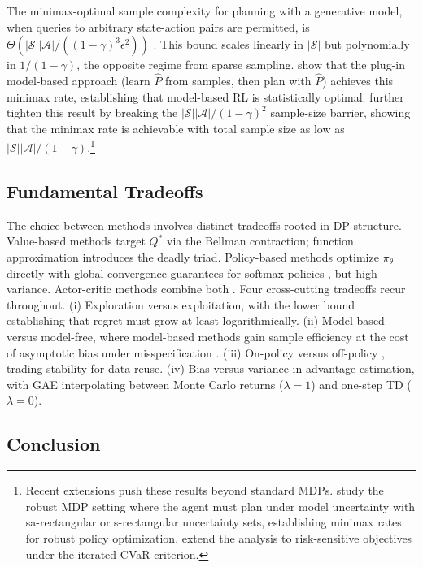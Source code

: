 The minimax-optimal sample complexity for planning with a generative model, when queries to arbitrary state-action pairs are permitted, is $\Theta(|\mathcal{S}||\mathcal{A}|/((1-\gamma)^3\epsilon^2))$ \citep{azar2013}. This bound scales linearly in $|\mathcal{S}|$ but polynomially in $1/(1-\gamma)$, the opposite regime from sparse sampling. \citet{agarwalKakadeYang2020} show that the plug-in model-based approach (learn $\hat{P}$ from samples, then plan with $\hat{P}$) achieves this minimax rate, establishing that model-based RL is statistically optimal. \citet{li2024breaking} further tighten this result by breaking the $|\mathcal{S}||\mathcal{A}|/(1-\gamma)^2$ sample-size barrier, showing that the minimax rate is achievable with total sample size as low as $|\mathcal{S}||\mathcal{A}|/(1-\gamma)$.\footnote{Recent extensions push these results beyond standard MDPs. \citet{clavier2024robust} study the robust MDP setting where the agent must plan under model uncertainty with sa-rectangular or s-rectangular uncertainty sets, establishing minimax rates for robust policy optimization. \citet{wang2025cvar} extend the analysis to risk-sensitive objectives under the iterated CVaR criterion.}

\subsection{Fundamental Tradeoffs}
\label{sec:tradeoffs}

The choice between methods involves distinct tradeoffs rooted in DP structure. Value-based methods target $Q^*$ via the Bellman contraction; function approximation introduces the deadly triad. Policy-based methods optimize $\pi_\theta$ directly with global convergence guarantees for softmax policies \citep{agarwal2021theory}, but high variance. Actor-critic methods combine both \citep{konda2000}. Four cross-cutting tradeoffs recur throughout. (i) Exploration versus exploitation, with the \citet{LaiRobbins1985} lower bound establishing that regret must grow at least logarithmically. (ii) Model-based versus model-free, where model-based methods gain sample efficiency at the cost of asymptotic bias under misspecification \citep{moerland2023}. (iii) On-policy versus off-policy \citep[Ch.~5--7]{sutton2018}, trading stability for data reuse. (iv) Bias versus variance in advantage estimation, with GAE \citep{Schulman2015} interpolating between Monte Carlo returns ($\lambda = 1$) and one-step TD ($\lambda = 0$).

\subsection{Conclusion}
\label{sec:ch2_conclusion}

